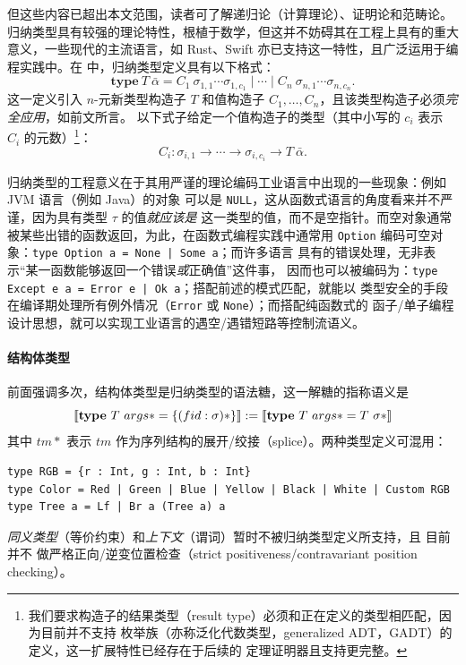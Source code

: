 \vspace{-.6em}
但这些内容已超出本文范围，读者可了解递归论（计算理论）、证明论和范畴论。
归纳类型具有较强的理论特性，根植于数学，但这并不妨碍其在工程上具有的重大意义，一些现代的主流语言，如
Rust、Swift 亦已支持这一特性，且广泛运用于编程实践中。在 \Tigris 中，归纳类型定义具有以下格式：
\vspace{-1em}
\begin{equation}
  \mathbf{type}\ T\ \bar{\alpha} =
  C_1\ \sigma_{1,1}\cdots\sigma_{1,c_1}
  \mid\cdots
  \mid C_n\ \sigma_{n,1}\cdots\sigma_{n,c_n}.
\end{equation}
这一定义引入 $n$-元新类型构造子 $T$ 和值构造子 \(C_1,\dots,C_n\)，且该类型构造子必须\emph{完全应用}，如前文所言。
以下式子给定一个值构造子的类型（其中小写的 $c_i$ 表示 $C_i$ 的元数）\footnote{
  我们要求构造子的结果类型（result type）必须和正在定义的类型相匹配，因为目前并不支持
  枚举族（亦称泛化代数类型，generalized ADT，GADT）的定义，这一扩展特性已经存在于后续的
  \Tigrisd 定理证明器且支持更完整。
}：
\vspace{-1em}
\begin{equation}
  C_i : \sigma_{i,1}\to\cdots\to\sigma_{i,c_i}\to T\ \bar{\alpha}.
\end{equation}

归纳类型的工程意义在于其用严谨的理论编码工业语言中出现的一些现象：例如 JVM 语言（例如 Java）的对象
可以是 \texttt{NULL}，这从函数式语言的角度看来并不严谨，因为具有类型 $\tau$ 的值\emph{就应该是}
这一类型的值，而不是空指针。而空对象通常被某些出错的函数返回，为此，在函数式编程实践中通常用
\texttt{Option} 编码可空对象：\texttt{type Option a = None | Some a}；而许多语言
具有的错误处理，无非表示“某一函数能够返回一个错误\emph{或}正确值”这件事，
因而也可以被编码为：\texttt{type Except e a = Error e | Ok a}；搭配前述的模式匹配，就能以
类型安全的手段在编译期处理所有例外情况（\texttt{Error} 或 \texttt{None}）；而搭配纯函数式的
函子/单子编程设计思想，就可以实现工业语言的遇空/遇错短路等控制流语义。
\paragraph{结构体类型} 前面强调多次，结构体类型是归纳类型的语法糖，这一解糖的指称语义是
\begin{equation}
  \llbracket \textbf{type}\ T\ args* = \{(fid : \sigma)*\} \rrbracket :=
  \llbracket \textbf{type}\ T\ args* = T\ \sigma* \rrbracket
\end{equation}
其中 $tm*$ 表示 $tm$ 作为序列结构的展开/绞接（splice）。两种类型定义可混用：
\begin{verbatim}
type RGB = {r : Int, g : Int, b : Int}
type Color = Red | Green | Blue | Yellow | Black | White | Custom RGB
type Tree a = Lf | Br a (Tree a) a
\end{verbatim}
\emph{同义类型}（等价约束）和\emph{上下文}（谓词）暂时不被归纳类型定义所支持，且 \Tigris 目前并不
做严格正向/逆变位置检查（strict positiveness/contravariant position checking）。

